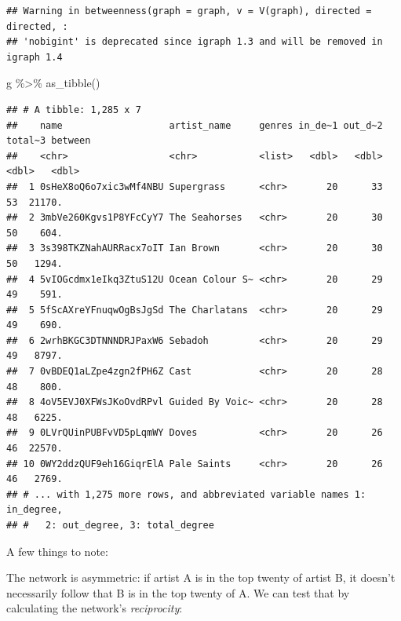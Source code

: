 \documentclass[
]{book}
\newenvironment{Shaded}{\begin{snugshade}}{\end{snugshade}}
\newcommand{\FunctionTok}[1]{\textcolor[rgb]{0.00,0.00,0.00}{#1}}
\newcommand{\NormalTok}[1]{#1}
\newcommand{\SpecialCharTok}[1]{\textcolor[rgb]{0.00,0.00,0.00}{#1}}
\begin{document}
\begin{verbatim}
## Warning in betweenness(graph = graph, v = V(graph), directed = directed, :
## 'nobigint' is deprecated since igraph 1.3 and will be removed in igraph 1.4
\end{verbatim}

\begin{Shaded}
\begin{Highlighting}[]
\NormalTok{g }\SpecialCharTok{\%\textgreater{}\%} \FunctionTok{as\_tibble}\NormalTok{() }
\end{Highlighting}
\end{Shaded}

\begin{verbatim}
## # A tibble: 1,285 x 7
##    name                   artist_name     genres in_de~1 out_d~2 total~3 between
##    <chr>                  <chr>           <list>   <dbl>   <dbl>   <dbl>   <dbl>
##  1 0sHeX8oQ6o7xic3wMf4NBU Supergrass      <chr>       20      33      53  21170.
##  2 3mbVe260Kgvs1P8YFcCyY7 The Seahorses   <chr>       20      30      50    604.
##  3 3s398TKZNahAURRacx7oIT Ian Brown       <chr>       20      30      50   1294.
##  4 5vIOGcdmx1eIkq3ZtuS12U Ocean Colour S~ <chr>       20      29      49    591.
##  5 5fScAXreYFnuqwOgBsJgSd The Charlatans  <chr>       20      29      49    690.
##  6 2wrhBKGC3DTNNNDRJPaxW6 Sebadoh         <chr>       20      29      49   8797.
##  7 0vBDEQ1aLZpe4zgn2fPH6Z Cast            <chr>       20      28      48    800.
##  8 4oV5EVJ0XFWsJKoOvdRPvl Guided By Voic~ <chr>       20      28      48   6225.
##  9 0LVrQUinPUBFvVD5pLqmWY Doves           <chr>       20      26      46  22570.
## 10 0WY2ddzQUF9eh16GiqrElA Pale Saints     <chr>       20      26      46   2769.
## # ... with 1,275 more rows, and abbreviated variable names 1: in_degree,
## #   2: out_degree, 3: total_degree
\end{verbatim}

A few things to note:

The network is asymmetric: if artist A is in the top twenty of artist B, it doesn't necessarily follow that B is in the top twenty of A. We can test that by calculating the network's \emph{reciprocity}:

\begin{Shaded}
\end{Shaded}
\end{document}
